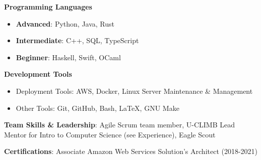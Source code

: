 \vspace{-2.0mm}


\begin{cventries}
\vspace{-5mm}
  \cventry
    {}
    {}
    {}
    {}
    {
      \begin{cvitems}
        \item {\textbf{Programming Languages}}
        \begin{itemize}
        \item \textbf{Advanced}: Python, Java, Rust
        \item \textbf{Intermediate}: C++, SQL, TypeScript
        \ifcv
        \item \textbf{Beginner}: Haskell, Swift, OCaml
        \fi
        \end{itemize}
        \item {\textbf{Development Tools}}
        \begin{itemize}
        \item {Deployment Tools: AWS, Docker, Linux Server Maintenance \& Management}
        \item {Other Tools: Git, GitHub, Bash, \LaTeX, GNU Make}
        \end {itemize}
        \item {\textbf{Team Skills \& Leadership}: Agile Scrum team
            member, U-CLIMB Lead Mentor for Intro to Computer Science (see Experience),
    Eagle Scout}
          \item {\textbf{Certifications}: Associate Amazon Web Services Solution's Architect (2018-2021)}
      \end{cvitems}
    }
    {}
\end{cventries}
